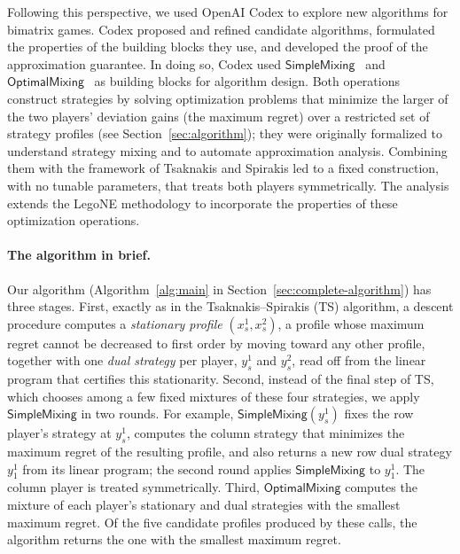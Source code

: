\documentclass[11pt]{article}
\theoremstyle{remark}
\theoremstyle{plain}
\newcommand{\sm}{\mathsf{SimpleMixing}}
\newcommand{\om}{\mathsf{OptimalMixing}}
\begin{document}
Following this perspective, we used OpenAI Codex to explore new algorithms for
bimatrix games. Codex proposed and refined candidate algorithms,
formulated the properties of the building blocks they use, and developed the proof of the
approximation guarantee. In doing so, Codex used $\sm$~\cite{automating2025} and $\om$~\cite{mixing2025} as building blocks for algorithm design.
Both operations construct strategies by solving optimization
problems that minimize the larger of the two players' deviation gains
(the maximum regret) over a restricted set of strategy profiles
(see Section~\ref{sec:algorithm}); they were
originally formalized to understand strategy mixing and to automate
approximation analysis. Combining them with the framework of Tsaknakis and
Spirakis led to a fixed construction, with no tunable parameters,
that treats both players symmetrically. The
analysis extends the LegoNE methodology to incorporate the properties of
these optimization operations.

\paragraph{The algorithm in brief.}
Our algorithm (Algorithm~\ref{alg:main} in
Section~\ref{sec:complete-algorithm}) has three stages.
First, exactly as in the Tsaknakis--Spirakis (TS) algorithm, a
descent procedure computes a \emph{stationary profile}
$(x_s^1,x_s^2)$, a profile whose maximum regret cannot be decreased
to first order by moving toward any other profile, together with one
\emph{dual strategy} per player, $y_s^1$ and $y_s^2$, read off from
the linear program that certifies this stationarity.
Second, instead of the final step of TS, which chooses among a few
fixed mixtures of these four strategies, we apply $\sm$ in two rounds.
For example, $\sm(y_s^1)$ fixes the row player's strategy at
$y_s^1$, computes the column strategy that minimizes the maximum
regret of the resulting profile, and also returns a new row dual
strategy $y_1^1$ from its linear program; the second round applies
$\sm$ to $y_1^1$. The column player is treated symmetrically.
Third, $\om$ computes the mixture of each player's stationary and
dual strategies with the smallest maximum regret. Of the five
candidate profiles produced by these calls, the algorithm returns the
one with the smallest maximum regret.
\end{document}
